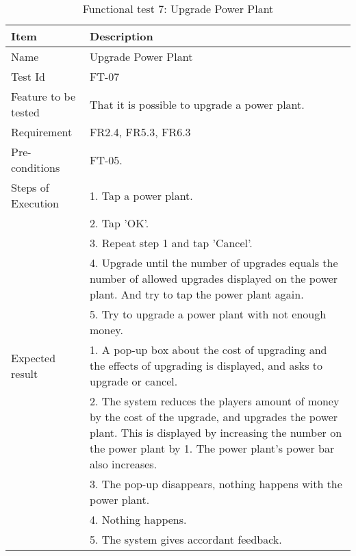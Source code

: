 \begin{table}[H]
\centering
	\begin{tabular}{ l | p{8cm} }
		\hline
		\rowcolor{lightgray}
		{\bf Item} & {\bf Description} \\ \hline
		Name & Upgrade Power Plant\\ 
		Test Id & FT-07 \\ 
		Feature to be tested & That it is possible to upgrade a power plant. \\ 
		Requirement & FR2.4, FR5.3, FR6.3 \\ 
		Pre-conditions & FT-05. \\ 
		Steps of Execution & 1. Tap a power plant. \\ 
		& 2. Tap 'OK'. \\
		& 3. Repeat step 1 and tap 'Cancel'. \\
		& 4. Upgrade until the number of upgrades equals the number of allowed upgrades displayed on the power plant. And try to tap the power plant again. \\
		& 5. Try to upgrade a power plant with not enough money. \\
		Expected result & 1. A pop-up box about the cost of upgrading and the effects of upgrading is displayed, and asks to upgrade or cancel. \\
		& 2. The system reduces the players amount of money by the cost of the upgrade, and upgrades the power plant. This is displayed by increasing the number on the power plant by 1. The power plant's power bar also increases. \\
		& 3. The pop-up disappears, nothing happens with the power plant. \\
		& 4. Nothing happens. \\
		& 5. The system gives accordant feedback. \\
		\hline
	\end{tabular}
	\caption{Functional test 7: Upgrade Power Plant}
\end{table}

